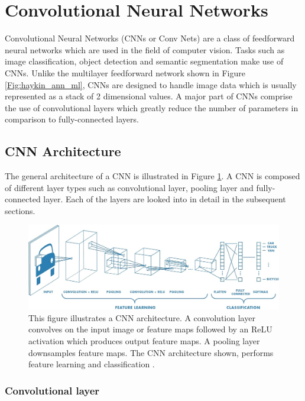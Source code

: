 \section{Convolutional Neural Networks}
\label{section:cnn}

Convolutional Neural Networks (CNNs or Conv Nets) are a class of feedforward neural networks which are used in the field of computer vision. Tasks such as image classification, object detection and semantic segmentation make use of CNNs. Unlike the multilayer feedforward network shown in Figure \ref{Fig:haykin_ann_ml}, CNNs are designed to handle image data which is usually represented as a stack of 2 dimensional values. A major part of CNNs comprise the use of convolutional layers which greatly reduce the number of parameters in comparison to fully-connected layers.

\subsection{CNN Architecture}

The general architecture of a CNN is illustrated in Figure \ref{Fig:cnn_arch}. A CNN is composed of different layer types such as convolutional layer, pooling layer and fully-connected layer. Each of the layers are looked into in detail in the subsequent sections.
	
	\begin{figure}[h]
		\centering
		\includegraphics[width=1\linewidth]{images/cnn_matlab}
		\caption{This figure illustrates a CNN architecture. A convolution layer convolves on the input image or feature maps followed by an ReLU activation which produces output feature maps. A pooling layer downsamples feature maps. The CNN architecture shown, performs feature learning and classification \cite{matlab_cnn}.}
		\label{Fig:cnn_arch}
	\end{figure}

\subsubsection{Convolutional layer}

